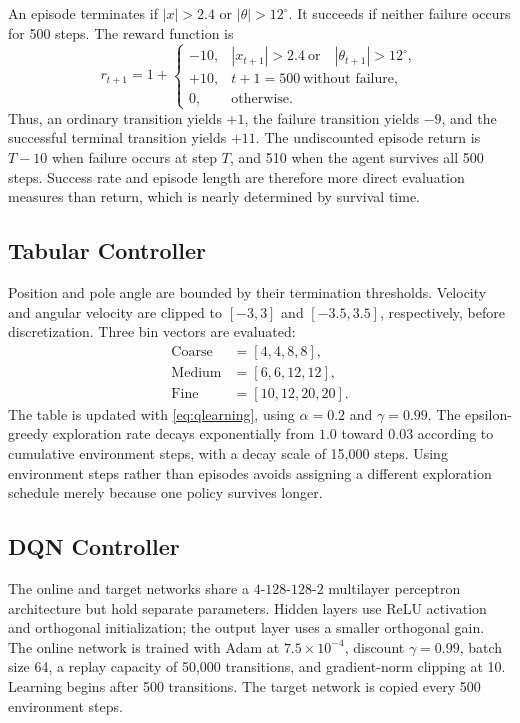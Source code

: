 \documentclass[conference]{IEEEtran}
\begin{document}
An episode terminates if $|x|>2.4$ or
$|\theta|>12^\circ$. It succeeds if neither failure occurs for 500 steps.
The reward function is
\begin{equation}
r_{t+1}=1+
\begin{cases}
-10, & |x_{t+1}|>2.4\ \text{or}
        \quad |\theta_{t+1}|>12^\circ,\\
+10, & t+1=500\ \text{without failure},\\
0, & \text{otherwise}.
\end{cases}
\label{eq:reward}
\end{equation}
Thus, an ordinary transition yields $+1$, the failure transition yields
$-9$, and the successful terminal transition yields $+11$. The undiscounted
episode return is $T-10$ when failure occurs at step $T$, and 510 when the
agent survives all 500 steps. Success rate and episode length are therefore
more direct evaluation measures than return, which is nearly determined by
survival time.

\subsection{Tabular Controller}

Position and pole angle are bounded by their termination thresholds.
Velocity and angular velocity are clipped to $[-3,3]$ and $[-3.5,3.5]$,
respectively, before discretization. Three bin vectors are evaluated:
\begin{align*}
\text{Coarse}&=[4,4,8,8],\\
\text{Medium}&=[6,6,12,12],\\
\text{Fine}&=[10,12,20,20].
\end{align*}
The table is updated with \eqref{eq:qlearning}, using
$\alpha=0.2$ and $\gamma=0.99$. The epsilon-greedy exploration rate decays
exponentially from $1.0$ toward $0.03$ according to cumulative environment
steps, with a decay scale of 15,000 steps. Using environment steps rather
than episodes avoids assigning a different exploration schedule merely
because one policy survives longer.

\subsection{DQN Controller}

The online and target networks share a $4$-$128$-$128$-$2$ multilayer
perceptron architecture but hold separate parameters. Hidden layers use ReLU
activation and orthogonal initialization; the output layer uses a smaller
orthogonal gain. The online network is trained with Adam at
$7.5\times10^{-4}$, discount $\gamma=0.99$, batch size 64, a replay capacity
of 50,000 transitions, and gradient-norm clipping at 10. Learning begins
after 500 transitions. The target network is copied every 500 environment
steps.
\end{document}
